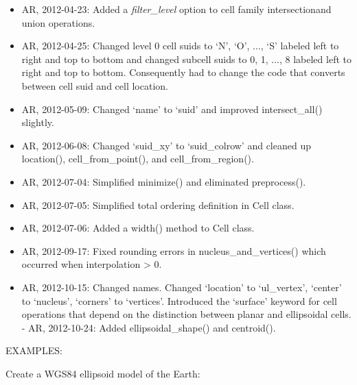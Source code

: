 \documentclass[a4paper,12ptopenany,oneside]{sphinxmanual}
\begin{document}
\begin{itemize}
\item {} 
AR, 2012-04-23: Added a \emph{filter\_level} option to cell family intersectionand union operations.

\item {} 
AR, 2012-04-25: Changed level 0 cell suids to `N', `O', ..., `S' labeled left to right and top to bottom and changed subcell suids to 0, 1, ..., 8 labeled left to right and top to bottom. Consequently had to change the code that converts between cell suid and cell location.

\item {} 
AR, 2012-05-09: Changed `name' to `suid' and improved intersect\_all() slightly.

\item {} 
AR, 2012-06-08: Changed `suid\_xy' to `suid\_colrow' and cleaned up location(), cell\_from\_point(), and cell\_from\_region().

\item {} 
AR, 2012-07-04: Simplified minimize() and eliminated preprocess().

\item {} 
AR, 2012-07-05: Simplified total ordering definition in Cell class.

\item {} 
AR, 2012-07-06: Added a width() method to Cell class.

\item {} 
AR, 2012-09-17: Fixed rounding errors in nucleus\_and\_vertices() which occurred when interpolation \textgreater{} 0.

\item {} 
AR, 2012-10-15: Changed names. Changed `location' to `ul\_vertex', `center' to `nucleus', `corners' to `vertices'. Introduced the `surface' keyword for cell operations that depend on the distinction between planar and ellipsoidal cells. - AR, 2012-10-24: Added ellipsoidal\_shape() and centroid().

\end{itemize}

EXAMPLES:

Create a WGS84 ellipsoid model of the Earth:
\end{document}
